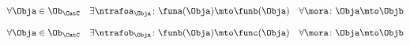 {\begin{forslides}
    \begin{equation}\label{eq:ex_nt_22}
        \forall \Obja \in \Ob_\CatC \quad \exists \ntrafoa_{\Obja} \colon \funa(\Obja) \mto \funb(\Obja) \quad  \forall \mora \colon \Obja \mto \Objb
    \end{equation}

    \begin{equation}\label{eq:ex_nt_23}
        \forall \Obja \in \Ob_\CatC \quad \exists \ntrafob_{\Obja} \colon \funb(\Obja) \mto \func(\Obja) \quad  \forall \mora \colon \Obja \mto \Objb
    \end{equation}




\end{forslides}}
